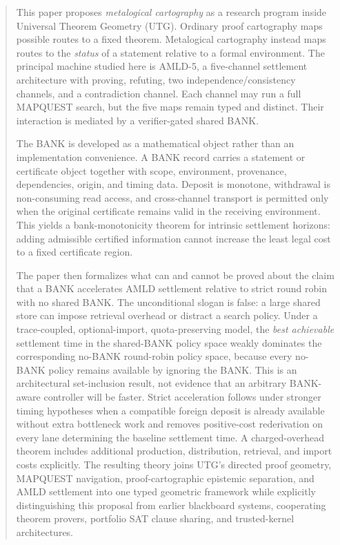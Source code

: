 \documentclass[11pt]{article}
\begin{document}
\begin{abstract}
This paper proposes \emph{metalogical cartography} as a research program inside Universal Theorem Geometry (UTG). Ordinary proof cartography maps possible routes to a fixed theorem. Metalogical cartography instead maps routes to the \emph{status} of a statement relative to a formal environment. The principal machine studied here is AMLD-5, a five-channel settlement architecture with proving, refuting, two independence/consistency channels, and a contradiction channel. Each channel may run a full MAPQUEST search, but the five maps remain typed and distinct. Their interaction is mediated by a verifier-gated shared BANK.

The BANK is developed as a mathematical object rather than an implementation convenience. A BANK record carries a statement or certificate object together with scope, environment, provenance, dependencies, origin, and timing data. Deposit is monotone, withdrawal is non-consuming read access, and cross-channel transport is permitted only when the original certificate remains valid in the receiving environment. This yields a bank-monotonicity theorem for intrinsic settlement horizons: adding admissible certified information cannot increase the least legal cost to a fixed certificate region.

The paper then formalizes what can and cannot be proved about the claim that a BANK accelerates AMLD settlement relative to strict round robin with no shared BANK. The unconditional slogan is false: a large shared store can impose retrieval overhead or distract a search policy. Under a trace-coupled, optional-import, quota-preserving model, the \emph{best achievable} settlement time in the shared-BANK policy space weakly dominates the corresponding no-BANK round-robin policy space, because every no-BANK policy remains available by ignoring the BANK. This is an architectural set-inclusion result, not evidence that an arbitrary BANK-aware controller will be faster. Strict acceleration follows under stronger timing hypotheses when a compatible foreign deposit is already available without extra bottleneck work and removes positive-cost rederivation on every lane determining the baseline settlement time. A charged-overhead theorem includes additional production, distribution, retrieval, and import costs explicitly. The resulting theory joins UTG's directed proof geometry, MAPQUEST navigation, proof-cartographic epistemic separation, and AMLD settlement into one typed geometric framework while explicitly distinguishing this proposal from earlier blackboard systems, cooperating theorem provers, portfolio SAT clause sharing, and trusted-kernel architectures.
\end{abstract}
\end{document}
